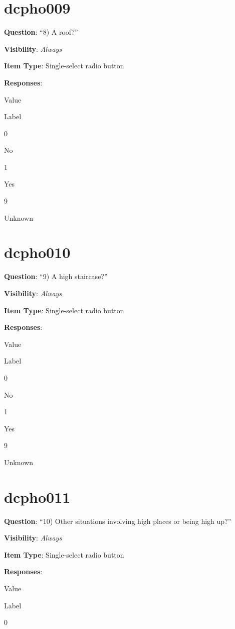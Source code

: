 \documentclass[]{book}
\begin{document}
\hypertarget{dcpho009}{%
\section{dcpho009}\label{dcpho009}}

\textbf{Question}: ``8) A roof?''

\textbf{Visibility}: \emph{Always}

\textbf{Item Type}: Single-select radio button

\textbf{Responses}:

Value

Label

0

No

1

Yes

9

Unknown

\hypertarget{dcpho010}{%
\section{dcpho010}\label{dcpho010}}

\textbf{Question}: ``9) A high staircase?''

\textbf{Visibility}: \emph{Always}

\textbf{Item Type}: Single-select radio button

\textbf{Responses}:

Value

Label

0

No

1

Yes

9

Unknown

\hypertarget{dcpho011}{%
\section{dcpho011}\label{dcpho011}}

\textbf{Question}: ``10) Other situations involving high places or being high up?''

\textbf{Visibility}: \emph{Always}

\textbf{Item Type}: Single-select radio button

\textbf{Responses}:

Value

Label

0
\end{document}
